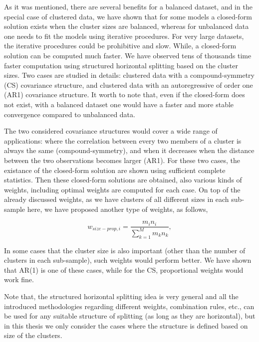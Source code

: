 \documentclass[11pt,a5paper,twoside]{book}
\begin{document}
As it was mentioned, there are several benefits for a balanced dataset, and in the special case of clustered data, we have shown that for some models a closed-form solution exists when the cluster sizes are balanced, whereas for unbalanced data one needs to fit the models using iterative procedures. For very large datasets, the iterative procedures could be prohibitive and slow. While, a closed-form solution can be computed much faster. We have observed tens of thousands time faster computation using structured horizontal splitting based on the cluster sizes. Two cases are studied in details: clustered data with a compound-symmetry (CS) covariance structure, and clustered data with an autoregressive of order one (AR1) covariance structure. It worth to note that, even if the closed-form does not exist, with a balanced dataset one would have a faster and more stable convergence compared to unbalanced data.

The two considered covariance structures would cover a wide range of applications: where the correlation between every two  members of a cluster is always the same (compound-symmetry), and when it decreases when the distance between the two observations becomes larger (AR1). For these two cases, the existance of the closed-form solution are shown using sufficient complete statistics. Then these closed-form solutions are obtained, also various kinds of weights, including optimal weights are computed for each case. On top of the already discussed weights, as we have clusters of all different sizes in each sub-sample here, we have proposed another type of weights, as follows,

\begin{equation}
\label{eq_size_prop_w}
w_{size-prop, i} = \frac{m_i n_i}{\sum_{k=1}^ M m_k n_k},
\end{equation}

In some cases that the cluster size is also important (other than the number of clusters in each sub-sample), such weights would perform better. We have shown that AR(1) is one of these cases, while for the CS, proportional weights would work fine. 

Note that, the structured horizontal splitting idea is very general and all the introduced methodologies regarding different weights, combination rules, etc., can be used for any suitable structure of splitting (as long as they are horizontal), but in this thesis we only consider the cases where the structure is defined based on size of the clusters. 
\end{document}
